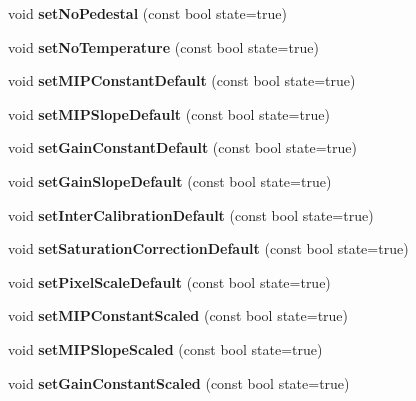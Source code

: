 \begin{DoxyCompactItemize}
\item 
void {\bfseries setNoPedestal} (const bool state=true)\label{classCALICE_1_1SiPMCalibrationStatusBits_a99d08b349011e1904c2ce7a56be12893}

\item 
void {\bfseries setNoTemperature} (const bool state=true)\label{classCALICE_1_1SiPMCalibrationStatusBits_a630a720aba57bd87f374f905137afc61}

\item 
void {\bfseries setMIPConstantDefault} (const bool state=true)\label{classCALICE_1_1SiPMCalibrationStatusBits_a61830eda8bad52c93a0d52ee894b9ca6}

\item 
void {\bfseries setMIPSlopeDefault} (const bool state=true)\label{classCALICE_1_1SiPMCalibrationStatusBits_a18239f598a72b273408ed87621468771}

\item 
void {\bfseries setGainConstantDefault} (const bool state=true)\label{classCALICE_1_1SiPMCalibrationStatusBits_abe90e6545d8a9642a983b9a06918ea21}

\item 
void {\bfseries setGainSlopeDefault} (const bool state=true)\label{classCALICE_1_1SiPMCalibrationStatusBits_ae4dbfe58c224c7fd091df561b6bf8d9f}

\item 
void {\bfseries setInterCalibrationDefault} (const bool state=true)\label{classCALICE_1_1SiPMCalibrationStatusBits_a26a1bd1746575ed33d4a29da9a8d5616}

\item 
void {\bfseries setSaturationCorrectionDefault} (const bool state=true)\label{classCALICE_1_1SiPMCalibrationStatusBits_a6769ef0abfbf1b7a4a04299e59f1702f}

\item 
void {\bfseries setPixelScaleDefault} (const bool state=true)\label{classCALICE_1_1SiPMCalibrationStatusBits_a8fd2d178a271756f146c16b12a457cb1}

\item 
void {\bfseries setMIPConstantScaled} (const bool state=true)\label{classCALICE_1_1SiPMCalibrationStatusBits_af3e46a6c99e475a7985342b4d5c35bbe}

\item 
void {\bfseries setMIPSlopeScaled} (const bool state=true)\label{classCALICE_1_1SiPMCalibrationStatusBits_a9cc049cf6b14c909f125a685d55f8c47}

\item 
void {\bfseries setGainConstantScaled} (const bool state=true)\label{classCALICE_1_1SiPMCalibrationStatusBits_ab3c28fa5fb81ad45eec71a1679d97ef1}


\end{DoxyCompactItemize}
